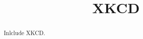 \documentclass{ximera}
\title[Example:]{XKCD}
\begin{document}
\begin{abstract}
  Inlclude XKCD.
\end{abstract}
\maketitle

\end{document}
